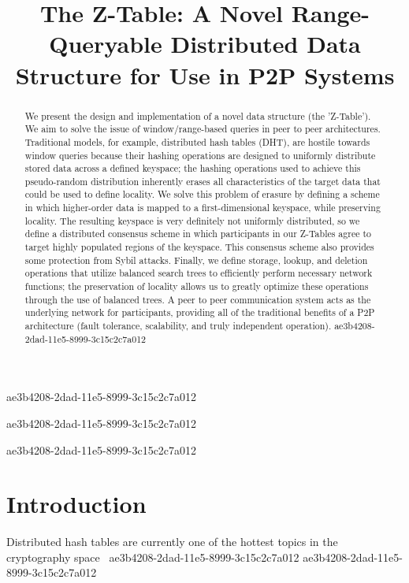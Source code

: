 \documentclass[12pt]{article}
\title{The Z-Table: A Novel Range-Queryable Distributed Data Structure for Use in P2P Systems}
\begin{document}
\maketitle
ae3b4208-2dad-11e5-8999-3c15c2c7a012
\begin{abstract}
We present the design and implementation of a novel data structure (the 'Z-Table'). We aim to solve the issue of window/range-based queries in peer to peer architectures. Traditional models, for example,  distributed hash tables (DHT), are hostile towards window queries because their hashing operations are designed to uniformly distribute stored data across a defined keyspace; the hashing operations used to achieve this pseudo-random distribution inherently erases all characteristics of the target data that could be used to define locality. We solve this problem of erasure by defining a scheme in which higher-order data is mapped to a first-dimensional keyspace, while preserving locality. The resulting keyspace is very definitely not uniformly distributed, so we define a distributed consensus scheme in which participants in our Z-Tables agree to target highly populated regions of the keyspace. This consensus scheme also provides some protection from Sybil attacks. Finally, we define storage, lookup, and deletion operations that utilize balanced search trees to efficiently perform necessary network functions; the preservation of locality allows us to greatly optimize these operations through the use of balanced trees. A peer to peer communication system acts as the underlying network for participants, providing all of the traditional benefits of a P2P architecture (fault tolerance, scalability, and truly independent operation).
ae3b4208-2dad-11e5-8999-3c15c2c7a012\end{abstract}
ae3b4208-2dad-11e5-8999-3c15c2c7a012

ae3b4208-2dad-11e5-8999-3c15c2c7a012\newpage
\section{Introduction}
Distributed hash tables are currently one of the hottest topics in the cryptography space~\cite{Stoica:2001dj,Rowstron:2001ea,Ratnasamy:2001wn}
ae3b4208-2dad-11e5-8999-3c15c2c7a012
ae3b4208-2dad-11e5-8999-3c15c2c7a012\printbibliography
\end{document}
